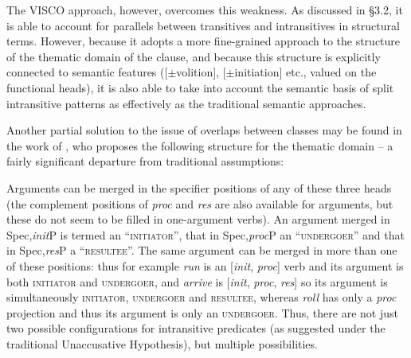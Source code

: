 \documentclass[output=paper]{langsci/langscibook}
\begin{document}
The VISCO approach, however, overcomes this weakness. As discussed in §3.2, it
is able to account for parallels between transitives and intransitives in
structural terms. However, because it adopts a more fine-grained approach to
the structure of the thematic domain of the clause, and because this structure
is explicitly connected to semantic features ([$\pm$volition],
[$\pm$initiation] etc., valued on the functional heads), it is also able to
take into account the semantic basis of split intransitive patterns as
effectively as the traditional semantic approaches.

Another partial solution to the issue of overlaps between classes may be found
in the work of \citet{Ramchand2008}, who proposes the following structure for
the thematic domain – a fairly significant departure from traditional
assumptions:

\ea
\z
Arguments can be merged in the specifier positions of any of these three heads
(the complement positions of \emph{proc} and \emph{res} are also available for
arguments, but these do not seem to be filled in one-argument verbs). An
argument merged in Spec,\emph{init}P is termed an \enquote{\textsc{initiator}},
that in Spec,\emph{proc}P an \enquote{\textsc{undergoer}} and that in
Spec,\emph{res}P a \enquote{\textsc{resultee}}. The same argument can be merged
in more than one of these positions: thus for example \emph{run} is an
[\emph{init}, \emph{proc}] verb and its argument is both \textsc{initiator} and
\textsc{undergoer}, and \emph{arrive} is [\emph{init}, \emph{proc}, \emph{res}]
so its argument is simultaneously \textsc{initiator},
\textsc{undergoer}\emph{\textsubscript{} }and \textsc{resultee}, whereas
\emph{roll} has only a \emph{proc} projection and thus its argument is only
an \textsc{undergoer.} Thus, there are not just two possible configurations for
intransitive predicates (as suggested under the traditional Unaccusative
Hypothesis), but multiple possibilities.
\end{document}
